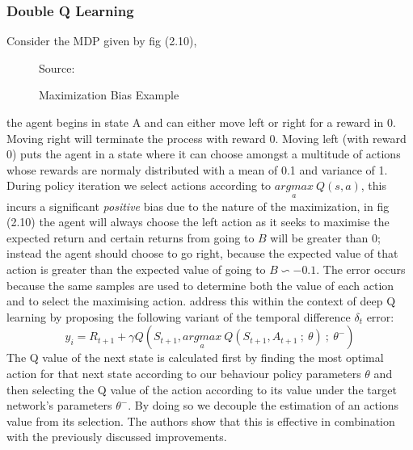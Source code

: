 \subsubsection{Double Q Learning }
Consider the MDP given by fig (2.10),
\begin{figure}[!htb]
    \caption{Maximization Bias Example}
    \begin{center}
    \end{center}
    \scriptsize{\dag Source: \cite{sutton2018reinforcement}}
\end{figure}
the agent begins in state A and can either move left or right for a reward in 0.
Moving right will terminate the process with reward 0. Moving left (with reward 0)
puts the agent in a state where it can choose amongst a multitude of actions whose
rewards are normaly distributed with a mean of 0.1 and variance of 1.
During policy iteration we select actions according to $\underset{a}{argmax} \: Q(s,a)$,
this incurs a significant \emph{positive} bias due to the nature of the maximization, in
fig (2.10) the agent will always choose the left action as it seeks to maximise the expected
return and certain returns from going to $B$ will be greater than 0; instead the agent should
choose to go right, because the expected value of that action is greater
than the expected value of going to $B \backsim -0.1$.
The error occurs because the same samples are used to determine both the value of each action and to select
the maximising action. \cite{Hasselt2015} address this within the context of deep Q learning
by proposing the following variant of the temporal difference $\delta_t$ error:
\begin{equation}
    y_i = R_{t+1} + \gamma Q(S_{t+1}, \underset{a}{argmax} \: Q(S_{t+1}, A_{t+1}\:;\:\theta)\:;\: \theta^-)
\end{equation}
The Q value of the next state is calculated first by finding the most optimal action for
that next state according to our behaviour policy parameters $\theta$ and then selecting
the Q value of the action according to its value under the target network's parameters $\theta^-$.
By doing so we decouple the estimation of an actions value from its selection. The authors
show that this is effective in combination with the previously discussed improvements.
